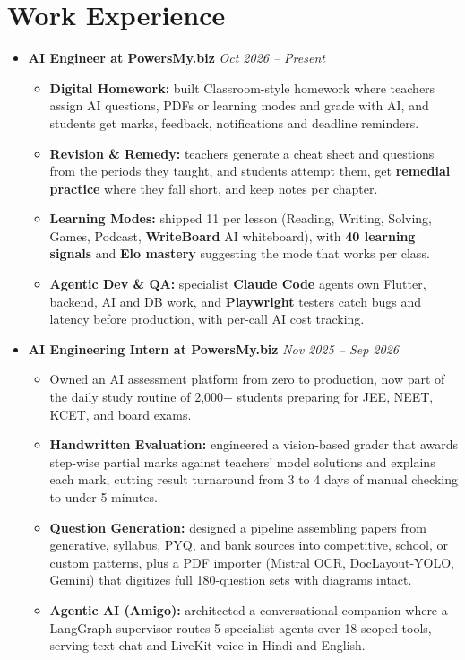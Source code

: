 \documentclass[a4paper,10pt]{article}
\begin{document}
\section{Work Experience}
\begin{itemize}
\item \textbf{AI Engineer at PowersMy.biz} \hfill \textit{\small{Oct 2026 -- Present}}
\begin{itemize}
    \item \textbf{Digital Homework:} built Classroom-style homework where teachers assign AI questions, PDFs or learning modes and grade with AI, and students get marks, feedback, notifications and deadline reminders.
    \item \textbf{Revision \& Remedy:} teachers generate a cheat sheet and questions from the periods they taught, and students attempt them, get \textbf{remedial practice} where they fall short, and keep notes per chapter.
    \item \textbf{Learning Modes:} shipped 11 per lesson (Reading, Writing, Solving, Games, Podcast, \textbf{WriteBoard} AI whiteboard), with \textbf{40 learning signals} and \textbf{Elo mastery} suggesting the mode that works per class.
    \item \textbf{Agentic Dev \& QA:} specialist \textbf{Claude Code} agents own Flutter, backend, AI and DB work, and \textbf{Playwright} testers catch bugs and latency before production, with per-call AI cost tracking.
\end{itemize}
\item \textbf{AI Engineering Intern at PowersMy.biz} \hfill \textit{\small{Nov 2025 -- Sep 2026}}
\begin{itemize}
    \item Owned an AI assessment platform from zero to production, now part of the daily study routine of 2,000+ students preparing for JEE, NEET, KCET, and board exams.
    \item \textbf{Handwritten Evaluation:} engineered a vision-based grader that awards step-wise partial marks against teachers' model solutions and explains each mark, cutting result turnaround from 3 to 4 days of manual checking to under 5 minutes.
    \item \textbf{Question Generation:} designed a pipeline assembling papers from generative, syllabus, PYQ, and bank sources into competitive, school, or custom patterns, plus a PDF importer (Mistral OCR, DocLayout-YOLO, Gemini) that digitizes full 180-question sets with diagrams intact.
    \item \textbf{Agentic AI (Amigo):} architected a conversational companion where a LangGraph supervisor routes 5 specialist agents over 18 scoped tools, serving text chat and LiveKit voice in Hindi and English.

\end{itemize}
\end{itemize}
\end{document}
